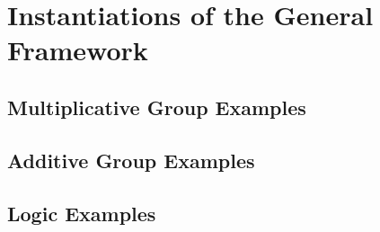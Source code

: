 \section{Instantiations of the General Framework}
\label{sec:instantiations}

\subsection{Multiplicative Group Examples}
\label{sec:multiplicative-examples}

\subsection{Additive Group Examples}
\label{sec:additive-examples}

\subsection{Logic Examples}
\label{sec:logic-examples}


